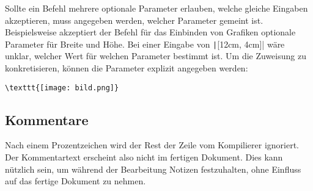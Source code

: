 \begin{table}[h!]
	\caption{Beispiele für \LaTeX-Befehle}
	\label{tbl:latex-commands}
\end{table}

Sollte ein Befehl mehrere optionale Parameter erlauben, welche gleiche Eingaben akzeptieren, muss angegeben werden, welcher Parameter gemeint ist. Beispielsweise akzeptiert der Befehl für das Einbinden von Grafiken optionale Parameter für Breite und Höhe. Bei einer Eingabe von \texttt|[12cm, 4cm]| wäre unklar, welcher Wert für welchen Parameter bestimmt ist. Um die Zuweisung zu konkretisieren, können die Parameter explizit angegeben werden:
\begin{verbatim}
\texttt{[image: bild.png]}
\end{verbatim}

\subsection{Kommentare}
\label{sub:kommentare}
Nach einem Prozentzeichen wird der Rest der Zeile vom Kompilierer ignoriert. Der Kommentartext erscheint also nicht im fertigen Dokument. Dies kann nützlich sein, um während der Bearbeitung Notizen festzuhalten, ohne Einfluss auf das fertige Dokument zu nehmen. 

